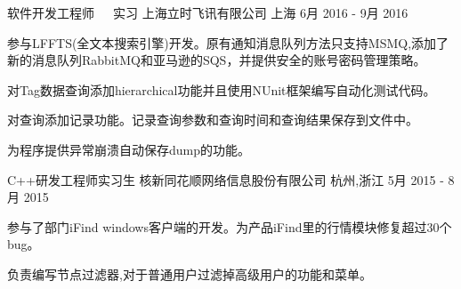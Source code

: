 \begin{cventries}
\cventry
{软件开发工程师~~~实习} %
{上海立时飞讯有限公司} %
{上海} %
{6月 2016 - 9月 2016} %
{ %
\begin{cvitems}
\item {参与LFFTS(全文本搜索引擎)开发。原有通知消息队列方法只支持MSMQ,添加了新的消息队列RabbitMQ和亚马逊的SQS，并提供安全的账号密码管理策略。}
\item {对Tag数据查询添加hierarchical功能并且使用NUnit框架编写自动化测试代码。}
\item {对查询添加记录功能。记录查询参数和查询时间和查询结果保存到文件中。}
\item {为程序提供异常崩溃自动保存dump的功能。}
\end{cvitems}
}


\cventry
{C++研发工程师实习生} %
{核新同花顺网络信息股份有限公司} %
{杭州,浙江} %
{5月 2015 - 8月 2015} %
{ %
\begin{cvitems}
\item {参与了部门iFind windows客户端的开发。为产品iFind里的行情模块修复超过30个bug。}
\item {负责编写节点过滤器,对于普通用户过滤掉高级用户的功能和菜单。}
\end{cvitems} 
}


\end{cventries}